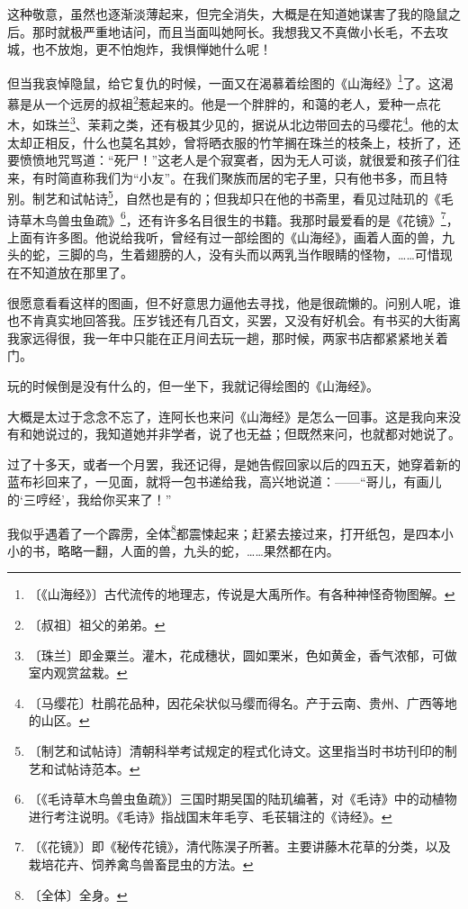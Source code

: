 \documentclass[12pt,UTF-8,openany]{ctexbook}
\begin{document}
\begin{normalsize}
    这种敬意，虽然也逐渐淡薄起来，但完全消失，大概是在知道她谋害了我的隐鼠之后。那时就极严重地诘问，而且当面叫她阿长。我想我又不真做小长毛，不去攻城，也不放炮，更不怕炮炸，我惧惮她什么呢！
    
    但当我哀悼隐鼠，给它复仇的时候，一面又在渴慕着绘图的《山海经》\footnote{〔《山海经》〕古代流传的地理志，传说是大禹所作。有各种神怪奇物图解。}了。这渴慕是从一个远房的叔祖\footnote{〔叔祖〕祖父的弟弟。}惹起来的。他是一个胖胖的，和蔼的老人，爱种一点花木，如珠兰\footnote{〔珠兰〕即金粟兰。灌木，花成穗状，圆如栗米，色如黄金，香气浓郁，可做室内观赏盆栽。}、茉莉之类，还有极其少见的，据说从北边带回去的马缨花\footnote{〔马缨花〕杜鹃花品种，因花朵状似马缨而得名。产于云南、贵州、广西等地的山区。}。他的太太却正相反，什么也莫名其妙，曾将晒衣服的竹竿搁在珠兰的枝条上，枝折了，还要愤愤地咒骂道：“死尸！”这老人是个寂寞者，因为无人可谈，就很爱和孩子们往来，有时简直称我们为“小友”。在我们聚族而居的宅子里，只有他书多，而且特别。制艺和试帖诗\footnote{〔制艺和试帖诗〕清朝科举考试规定的程式化诗文。这里指当时书坊刊印的制艺和试帖诗范本。}，自然也是有的；但我却只在他的书斋里，看见过陆玑的《毛诗草木鸟兽虫鱼疏》\footnote{〔《毛诗草木鸟兽虫鱼疏》〕三国时期吴国的陆玑编著，对《毛诗》中的动植物进行考注说明。《毛诗》指战国末年毛亨、毛苌辑注的《诗经》。}，还有许多名目很生的书籍。我那时最爱看的是《花镜》\footnote{〔《花镜》〕即《秘传花镜》，清代陈淏子所著。主要讲藤木花草的分类，以及栽培花卉、饲养禽鸟兽畜昆虫的方法。}，上面有许多图。他说给我听，曾经有过一部绘图的《山海经》，画着人面的兽，九头的蛇，三脚的鸟，生着翅膀的人，没有头而以两乳当作眼睛的怪物，……可惜现在不知道放在那里了。
    
    很愿意看看这样的图画，但不好意思力逼他去寻找，他是很疏懒的。问别人呢，谁也不肯真实地回答我。压岁钱还有几百文，买罢，又没有好机会。有书买的大街离我家远得很，我一年中只能在正月间去玩一趟，那时候，两家书店都紧紧地关着门。
    
    玩的时候倒是没有什么的，但一坐下，我就记得绘图的《山海经》。
    
    大概是太过于念念不忘了，连阿长也来问《山海经》是怎么一回事。这是我向来没有和她说过的，我知道她并非学者，说了也无益；但既然来问，也就都对她说了。
    
    过了十多天，或者一个月罢，我还记得，是她告假回家以后的四五天，她穿着新的蓝布衫回来了，一见面，就将一包书递给我，高兴地说道：——“哥儿，有画儿的‘三哼经’，我给你买来了！”
    
    我似乎遇着了一个霹雳，全体\footnote{〔全体〕全身。}都震悚起来；赶紧去接过来，打开纸包，是四本小小的书，略略一翻，人面的兽，九头的蛇，……果然都在内。
    

\end{normalsize}
\end{document}
